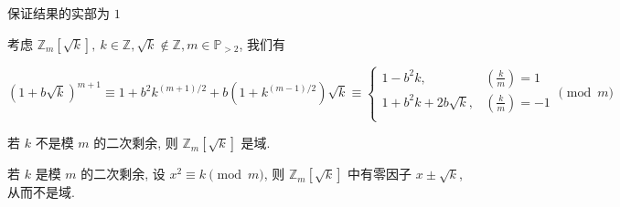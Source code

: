保证结果的实部为 \(1\)

考虑 \(\mathbb{Z}_m\left[\sqrt{k}\right],~k\in\mathbb{Z},\sqrt{k}\notin \mathbb{Z},m\in\mathbb{P}_{>2}\), 我们有

\[
    \left(1+b\sqrt{k}\right)^{m+1}\equiv 1+b^2 k^{(m+1)/2} + b\left(1+k^{(m-1)/2}\right)\sqrt{k} \equiv\begin{cases}
        1-b^2 k,              & \left(\frac{k}{m}\right)=1  \\
        1+b^2 k + 2b\sqrt{k}, & \left(\frac{k}{m}\right)=-1 \\
    \end{cases} \pmod m
\]

若 \(k\) 不是模 \(m\) 的二次剩余, 则 \(\mathbb{Z}_m\left[\sqrt{k}\right]\) 是域.

若 \(k\) 是模 \(m\) 的二次剩余, 设 \(x^2\equiv k\pmod m\), 则 \(\mathbb{Z}_m\left[\sqrt{k}\right]\) 中有零因子 \(x\pm\sqrt{k}\), 从而不是域.
